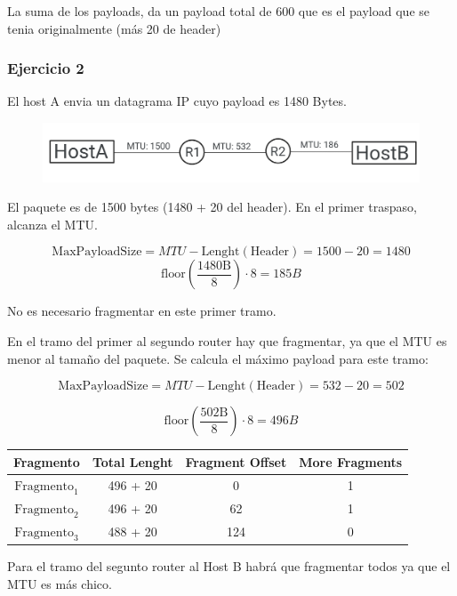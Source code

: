 La suma de los payloads, da un payload total de 600 que es el payload que se tenia originalmente (más 20 de header)

\subsubsection{Ejercicio 2}


El host A envia un datagrama IP cuyo payload es 1480 Bytes.

\begin{figure}[H]
\centering
\includegraphics[width=\textwidth]{imagenes/enunciadoFragmentacion.png}
\end{figure}


El paquete es de 1500 bytes (1480 + 20 del header). En el primer traspaso, alcanza el MTU.

$$ \mathrm{MaxPayloadSize} = MTU - \mathrm{Lenght}(\mathrm{Header}) = 1500 - 20 = 1480 $$
$$\mathrm{floor}(\frac{\mathrm{1480 B}}{8}) \cdot 8 = 185 B$$

No es necesario fragmentar en este primer tramo.

En el tramo del primer al segundo router hay que fragmentar, ya que el MTU es menor al tamaño del paquete. Se calcula el máximo payload para este tramo:

$$ \mathrm{MaxPayloadSize} = MTU - \mathrm{Lenght}(\mathrm{Header}) = 532 - 20 = 502 $$

$$\mathrm{floor}(\frac{\mathrm{502 B}}{8}) \cdot 8 = 496 B$$

\begin{center}
    \begin{tabular}{c|c|c|c}
        Fragmento & Total Lenght & Fragment Offset & More Fragments \\
        \hline
        \hline
        $ \mathrm{Fragmento}_1 $ & 496 + 20  & 0 & 1\\
        $ \mathrm{Fragmento}_2 $ &  496 + 20 & 62 & 1\\
        $ \mathrm{Fragmento}_3 $ & 488 + 20 & 124 & 0\\
    \end{tabular}
\end{center}

Para el tramo del segunto router al Host B habrá que fragmentar todos ya que el MTU es más chico.


